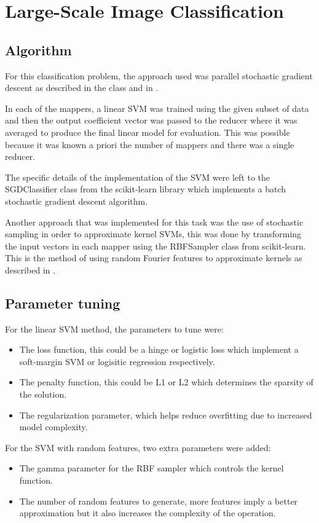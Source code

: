 \documentclass[a4paper, 11pt]{article}
\begin{document}
\clearpage
\section{Large-Scale Image Classification}
\subsection{Algorithm}

For this classification problem, the approach used was parallel stochastic gradient descent as described in the class and in \cite{zinkevich2010parallelized}.

In each of the mappers, a linear SVM was trained using the given subset of data and then the output coefficient vector was passed to the reducer where it was averaged to produce the final linear model for evaluation. This was possible because it was known a priori the number of mappers and there was a single reducer.

The specific details of the implementation of the SVM were left to the SGDClassifier class from the scikit-learn library \cite{scikit-learn} which implements a batch stochastic gradient descent algorithm.

Another approach that was implemented for this task was the use of stochastic sampling in order to approximate kernel SVMs, this was done by transforming the input vectors in each mapper using the RBFSampler class from scikit-learn. This is the method of using random Fourier features to approximate kernels as described in \cite{rahimi2007random}.

\subsection{Parameter tuning}
For the linear SVM method, the parameters to tune were:
\begin{itemize}
	\item The loss function, this could be a hinge or logistic loss which implement a soft-margin SVM or logisitic regression respectively.
	\item The penalty function, this could be L1 or L2 which determines the sparsity of the solution.
	\item The regularization parameter, which helps reduce overfitting due to increased model complexity.
\end{itemize}

For the SVM with random features, two extra parameters were added:
\begin{itemize}
	\item The gamma parameter for the RBF sampler which controls the kernel function.
	\item The number of random features to generate, more features imply a better approximation but it also increases the complexity of the operation.
\end{itemize}
\end{document}
